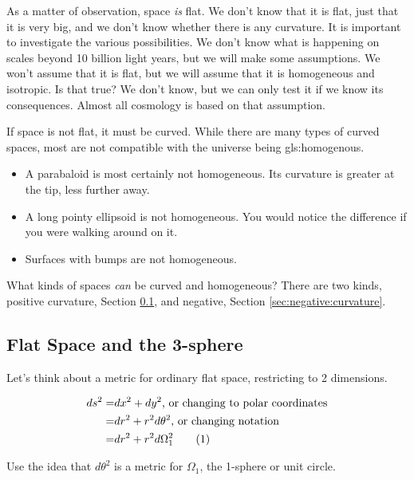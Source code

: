 \documentclass[]{article}
\newcommand\numberthis{\addtocounter{equation}{1}\tag{\theequation}}
\begin{document}
As a matter of observation, space \emph{is} flat. We don't know that it is flat, just that it is very big, and we don't know whether there is any curvature. It is important to investigate the various possibilities. We don't know what is happening on scales beyond 10 billion light years, but we will make some assumptions. We won't assume that it is flat, but we will assume that it is homogeneous and isotropic. Is that true? We don't know, but we can only test it if we know its consequences. Almost all cosmology is based on that assumption.

If space is not flat, it must be curved. While there are many types of curved spaces, most are not compatible with the universe being \gls{gls:homogenous}.

\begin{itemize}
	\item A parabaloid is most certainly not homogeneous. Its curvature is greater at the tip, less further away.
	\item A long pointy ellipsoid is not homogeneous. You would notice the difference if you were walking around on it.
	\item Surfaces with bumps are not homogeneous.
\end{itemize}

What kinds of spaces \emph{can} be curved and homogeneous? There are two kinds, positive curvature, Section \ref{sec:positive:curvature}, and negative, Section \ref{sec:negative:curvature}.

\subsection{Flat Space and the 3-sphere}\label{sec:positive:curvature}

Let's think about a metric for ordinary flat space, restricting to 2 dimensions.

\begin{align*}
	ds^2 =& dx^2 + dy^2\text{, or changing to polar coordinates}\\
	=&dr^2 + r^2 d\theta^2 \text{, or changing notation}\\
	=&dr^2 + r^2 d\Omega_1^2 \numberthis \label{eq:flat:polar}
\end{align*}

Use the idea that $d\theta^2$ is a  metric for $\Omega_1$, the 1-sphere or unit circle.
\end{document}
